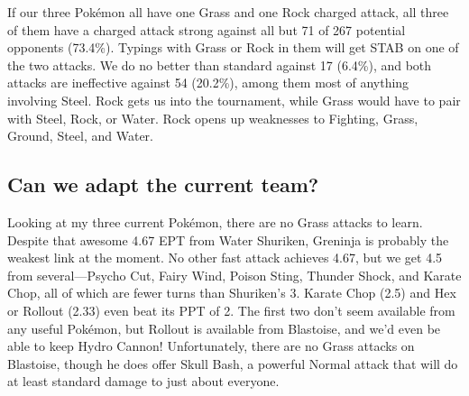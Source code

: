 If our three Pokémon all have one Grass and one Rock charged attack,
  all three of them have a charged attack strong against all but
  71 of 267 potential opponents (73.4\%).
Typings with Grass or Rock in them will get STAB on one of the two attacks.
We do no better than standard against 17 (6.4\%), and both attacks are
  ineffective against 54 (20.2\%), among them most of anything involving
  Steel.
Rock gets us into the tournament, while Grass would have to pair with Steel,
  Rock, or Water.
Rock opens up weaknesses to Fighting, Grass, Ground, Steel, and Water.

\subsection{Can we adapt the current team?}
Looking at my three current Pokémon, there are no Grass attacks to learn.
Despite that awesome 4.67 EPT from Water Shuriken, Greninja is probably
  the weakest link at the moment.
No other fast attack achieves 4.67, but we get 4.5 from several---Psycho
  Cut, Fairy Wind, Poison Sting, Thunder Shock, and Karate Chop,
  all of which are fewer turns than Shuriken's 3.
Karate Chop (2.5) and Hex or Rollout (2.33) even beat its PPT of 2.
The first two don't seem available from any useful Pokémon, but
  Rollout is available from Blastoise, and we'd even be able to
  keep Hydro Cannon!
Unfortunately, there are no Grass attacks on Blastoise, though
  he does offer Skull Bash, a powerful Normal attack that
  will do at least standard damage to just about everyone.
